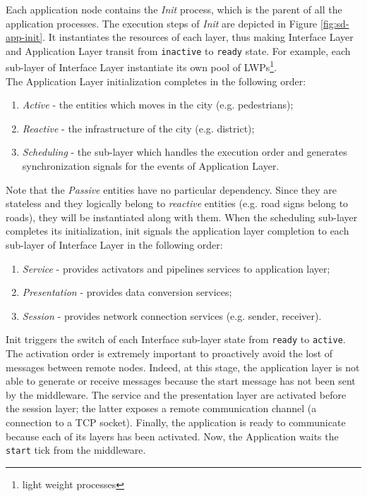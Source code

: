 
Each application node contains the \textit{Init} process,
which is the parent of all the application processes.
The execution steps of \textit{Init} are depicted in Figure
\ref{fig:sd-app-init}.
It instantiates the resources of each layer, thus making
Interface Layer and Application Layer transit from \verb|inactive|
to \verb|ready| state.
For example, each sub-layer of Interface Layer instantiate its own pool of
LWPs\footnote{light weight processes}.
\\
The Application Layer initialization completes in the following order:
\begin{enumerate}
	\item \textit{Active} - the entities which moves in the city
	(e.g. pedestrians);
	\item \textit{Reactive} - the infrastructure of the city (e.g. district);
	\item \textit{Scheduling} - the sub-layer which handles the execution order
	and generates synchronization signals for the events of Application Layer.
\end{enumerate}
Note that the \textit{Passive} entities have no particular dependency. Since
they are stateless and they logically belong to \textit{reactive} entities
(e.g. road signs belong to roads), they will be instantiated along with them.
When the scheduling sub-layer completes its initialization, init signals
the application layer completion to each sub-layer of Interface Layer in the
following order:
\begin{enumerate}
	\item \textit{Service} - provides activators and pipelines services to
	application layer;
	\item \textit{Presentation} - provides data conversion services;
	\item \textit{Session} - provides network connection services
	(e.g. sender, receiver).
\end{enumerate}
Init triggers the switch of each Interface sub-layer state from
\verb|ready| to \verb|active|.
The activation order is extremely important to
proactively avoid the lost of messages between remote nodes. Indeed, at this
stage, the application layer is not able to generate or receive messages
because the start message has not been sent by the middleware.
The service and
the presentation layer are activated before the session layer; the latter
exposes a remote communication channel (a connection to a TCP socket).
Finally, the application is ready to communicate because each of its layers
has been activated. Now, the Application waits the \verb|start| tick from the
middleware.

